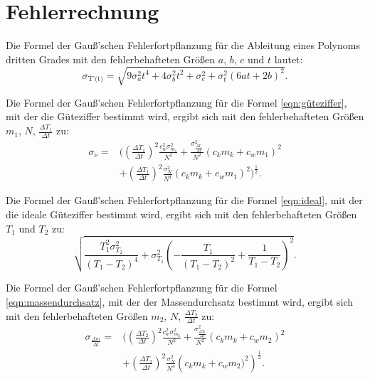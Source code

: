 \section{Fehlerrechnung}

Die Formel der Gauß'schen Fehlerfortpflanzung für die Ableitung eines Polynoms dritten Grades mit den fehlerbehafteten Größen 
 $a$, $b$, $c$ und $t$ lautet:
\begin{equation}
    \sigma_\text{T'(t)} = \sqrt{9 \sigma_{a}^{2} t^{4} + 4 \sigma_{b}^{2} t^{2} + \sigma_{c}^{2} + \sigma_{t}^{2} \left(6 a t + 2 b\right)^{2}}.
    \label{eqn:pol3}
\end{equation}

\noindent Die Formel der Gauß'schen Fehlerfortpflanzung für die Formel \ref{eqn:güteziffer}, mit der die Güteziffer bestimmt wird, ergibt sich mit den fehlerbehafteten Größen 
$m_1$, $N$, $\frac{\Delta T_1}{\Delta t}$ zu:
\begin{equation}
    \begin{split}
        \sigma_{\nu} = {} &\Biggl(\left(\frac{\Delta T_1}{\Delta t}\right)^{2}\frac{c_{w}^{2} \sigma_{m_{1}}^{2}}{N^{2}}  
    + \frac{\sigma_{\frac{\Delta T_1}{\Delta t}}^{2}}{N^{2}} \left(c_{k} m_{k} + c_{w} m_{1}\right)^{2}  \\
    &+\left(\frac{\Delta T_1}{\Delta t}\right)^{2} \frac{\sigma_{N}^{2}}{N^{4}} \left(c_{k} m_{k} + c_{w} m_{1}\right)^{2}\Biggr)^{\frac{1}{2}}.
    \end{split}
\label{eq:gütefehler}
\end{equation}

\noindent Die Formel der Gauß'schen Fehlerfortpflanzung für die Formel \ref{eqn:ideal}, mit der die ideale Güteziffer bestimmt wird, ergibt sich mit den fehlerbehafteten Größen 
$T_1$ und $T_2$ zu:
\begin{equation}
\sqrt{\frac{T_{1}^{2} \sigma_{T_{2}}^{2}}{\left(T_{1} - T_{2}\right)^{4}} + \sigma_{T_{1}}^{2} \left(- \frac{T_{1}}{\left(T_{1} - T_{2}\right)^{2}} + \frac{1}{T_{1} - T_{2}}\right)^{2}}.
    \label{eq:idealFehler}
\end{equation}

\noindent Die Formel der Gauß'schen Fehlerfortpflanzung für die Formel \ref{eqn:massendurchsatz}, mit der der Massendurchsatz bestimmt wird, ergibt sich mit den fehlerbehafteten Größen 
$m_2$, $N$, $\frac{\Delta T_2}{\Delta t}$ zu:
\begin{equation}
    \begin{split}
        \sigma_{\frac{\Delta m}{\Delta t}} = {} & \Biggl(\left(\frac{\Delta T_2}{\Delta t}\right)^{2}\frac{c_{w}^{2} \sigma_{m_{2}}^{2}}{N^{2}} 
    + \frac{\sigma_{\frac{\Delta T_2}{\Delta t}}^{2}}{N^{2}} \left(c_{k} m_{k} + c_{w} m_{2}\right)^{2} \\ 
    &    +\left(\frac{\Delta T_2}{\Delta t}\right)^{2} \frac{\sigma_{N}^{2}}{N^{4}} \left(c_{k} m_{k} + c_{w} m_{2}\Biggr)^{2}\right)^{\frac{1}{2}}.
    \end{split}
    \label{eq:massendurchsatzFehler}
\end{equation}

